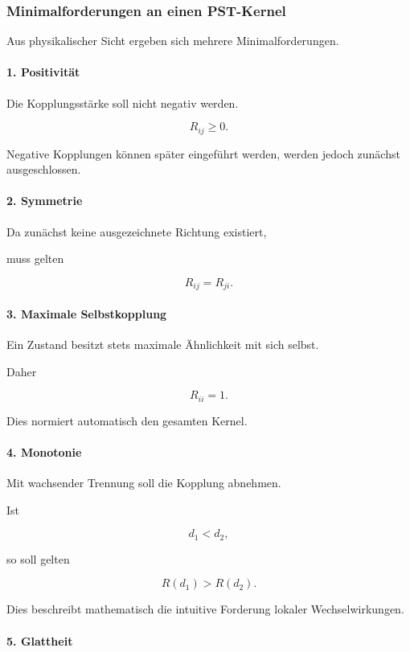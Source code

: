 \bigskip

\subsubsection{Minimalforderungen an einen PST-Kernel}

Aus physikalischer Sicht ergeben sich mehrere
Minimalforderungen.

\paragraph{1. Positivität}

Die Kopplungsstärke soll nicht negativ werden.

\[
R_{ij}\ge0.
\]

Negative Kopplungen können später eingeführt werden,
werden jedoch zunächst ausgeschlossen.

\paragraph{2. Symmetrie}

Da zunächst keine ausgezeichnete Richtung existiert,

muss gelten

\[
R_{ij}=R_{ji}.
\]

\paragraph{3. Maximale Selbstkopplung}

Ein Zustand besitzt stets maximale Ähnlichkeit mit sich selbst.

Daher

\[
R_{ii}=1.
\]

Dies normiert automatisch den gesamten Kernel.

\paragraph{4. Monotonie}

Mit wachsender Trennung soll die Kopplung
abnehmen.

Ist

\[
d_1<d_2,
\]

so soll gelten

\[
R(d_1)>R(d_2).
\]

Dies beschreibt mathematisch die intuitive Forderung
lokaler Wechselwirkungen.

\paragraph{5. Glattheit}

